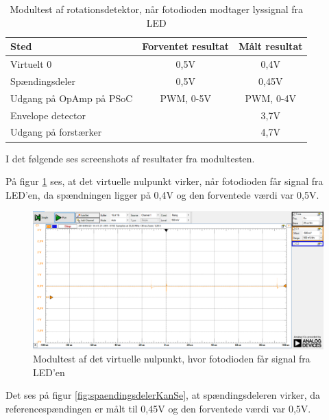 \begin{table}[H]
	\centering
	\begin{tabular}{|l|c|c|}
		\hline
		\textbf{Sted}           & \textbf{Forventet resultat} & \textbf{Målt resultat} \\ \hline
		Virtuelt 0              & 0,5V                        & 0,4V                   \\ \hline
		Spændingsdeler          & 0,5V                        & 0,45V                  \\ \hline
		Udgang på OpAmp på PSoC & PWM, 0-5V                   & PWM, 0-4V              \\ \hline
		Envelope detector       & \multicolumn{1}{l|}{}       & 3,7V                   \\ \hline
		Udgang på forstærker    & \multicolumn{1}{l|}{}       & 4,7V                   \\ \hline
	\end{tabular}
	\caption{Modultest af rotationsdetektor, når fotodioden modtager lyssignal fra LED}
	\label{dioderSe}
\end{table}

\noindent I det følgende ses screenshots af resultater fra modultesten. 

\noindent På figur \ref{fig:virt0KanSe} ses, at det virtuelle nulpunkt virker, når fotodioden får signal fra LED'en, da spændningen ligger på 0,4V og den forventede værdi var 0,5V. 

\begin{figure}[H]
	\centering
	\includegraphics[width=\textwidth]{Test/images/AffyringTest/KanSe/virtuelt_nul}
	\caption{Modultest af det virtuelle nulpunkt, hvor fotodioden får signal fra LED'en}
	\label{fig:virt0KanSe}
\end{figure}

\noindent Det ses på figur \ref{fig:spaendingsdelerKanSe}, at spændingsdeleren virker, da referencespændingen er målt til 0,45V og den forventede værdi var 0,5V. 

